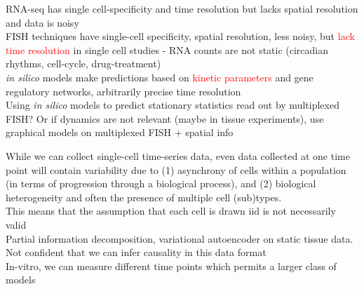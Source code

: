 \documentclass[aspectratio=1610]{beamer}					%
\begin{document}
\begin{frame}{}
RNA-seq has single cell-specificity and time resolution but lacks spatial resolution and data is noisy\\
\vspace{0.2in}
FISH techniques have single-cell specificity, spatial resolution, less noisy, but \textcolor{red}{lack time resolution} in single cell studies - RNA counts are not static (circadian rhythms, cell-cycle, drug-treatment)\\
\vspace{0.2in}
\emph{in silico} models make predictions based on \textcolor{red}{kinetic parameters} and gene regulatory networks, arbitrarily precise time resolution\\
\vspace{0.2in}
Using \emph{in silico} models to predict stationary statistics read out by multiplexed FISH? Or if dynamics are not relevant (maybe in tissue experiments), use graphical models on multiplexed FISH + spatial info
\end{frame}

\begin{frame}{}

While we can collect single-cell time-series data, even data collected at one time
point will contain variability due to (1) asynchrony of cells within a population (in terms of progression through a biological process), and (2) biological heterogeneity and often the presence of multiple cell (sub)types.\\
\vspace{0.2in}
This means that the assumption that each cell is drawn iid is not necessarily valid\\
\vspace{0.2in}
Partial information decomposition, variational autoencoder on static tissue data. Not confident that we can infer causality in this data format\\
\vspace{0.2in}
In-vitro, we can measure different time points which permits a larger class of models
\end{frame}
\end{document}
